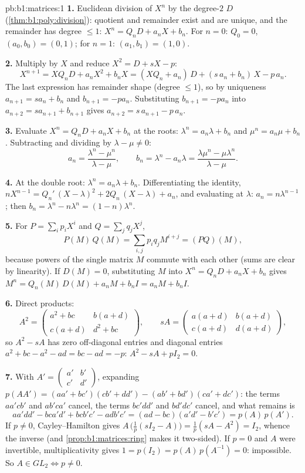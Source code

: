 \begin{solution}{pb:b1:matrices:1}
\textbf{1.} Euclidean division of $X^n$ by the degree-$2$ 
$D$ (\cref{thm:b1:poly:division}): quotient and remainder exist
and are unique, and the remainder has degree $\leq 1$: $X^n =
Q_n D + a_n X + b_n$. For $n = 0$: $Q_0 = 0$, $(a_0, b_0) = (0,
1)$; for $n = 1$: $(a_1, b_1) = (1, 0)$.

\textbf{2.} Multiply by $X$ and reduce $X^2 = D + sX - p$:
\[
X^{n+1} = X Q_n D + a_n X^2 + b_n X
= (X Q_n + a_n)\,D + (s\,a_n + b_n)\,X - p\,a_n .
\]
The last expression has remainder shape (degree $\leq 1$), so by
uniqueness $a_{n+1} = s a_n + b_n$ and $b_{n+1} = -p a_n$.
Substituting $b_{n+1} = -pa_n$ into $a_{n+2} = s a_{n+1} +
b_{n+1}$ gives $a_{n+2} = s\,a_{n+1} - p\,a_n$.

\textbf{3.} Evaluate $X^n = Q_n D + a_n X + b_n$ at the roots:
$\lambda^n = a_n\lambda + b_n$ and $\mu^n = a_n\mu + b_n$.
Subtracting and dividing by $\lambda - \mu \neq 0$:
\[
a_n = \frac{\lambda^n - \mu^n}{\lambda - \mu},
\qquad
b_n = \lambda^n - a_n\lambda
= \frac{\lambda\mu^n - \mu\lambda^n}{\lambda - \mu} .
\]

\textbf{4.} At the double root: $\lambda^n = a_n\lambda + b_n$.
Differentiating the identity, $nX^{n-1} = Q_n'\,(X - \lambda)^2
+ 2Q_n\,(X - \lambda) + a_n$, and evaluating at $\lambda$: $a_n
= n\lambda^{n-1}$; then $b_n = \lambda^n - n\lambda^{n} = (1 -
n)\lambda^{n}$.

\textbf{5.} For $P = \sum_i p_i X^i$ and $Q = \sum_j q_j X^j$,
\[
P(M)\,Q(M) = \sum_{i,j} p_i q_j M^{i+j} = (PQ)(M),
\]
because powers of the single matrix $M$ commute with each other
(sums are clear by linearity). If $D(M) = 0$, substituting $M$
into $X^n = Q_n D + a_n X + b_n$ gives $M^n = Q_n(M)\,D(M) + a_n
M + b_n I = a_n M + b_n I$.

\textbf{6.} Direct products:
\[
A^2 = \begin{pmatrix}
a^2 + bc & b(a + d)\\
c(a + d) & d^2 + bc
\end{pmatrix},
\qquad
s A = \begin{pmatrix}
a(a+d) & b(a+d)\\
c(a+d) & d(a+d)
\end{pmatrix},
\]
so $A^2 - sA$ has zero off-diagonal entries and diagonal entries
$a^2 + bc - a^2 - ad = bc - ad = -p$: $A^2 - sA + pI_2 = 0$.

\textbf{7.} With $A' = \begin{pmatrix} a' & b'\\ c' &
d'\end{pmatrix}$, expanding $p(AA') = (aa' + bc')(cb' + dd') -
(ab' + bd')(ca' + dc')$: the terms $aa'cb'$ and $ab'ca'$ cancel,
the terms $bc'dd'$ and $bd'dc'$ cancel, and what remains is
\[
aa'dd' - bca'd' + bcb'c' - adb'c'
= (ad - bc)(a'd' - b'c') = p(A)\,p(A').
\]
If $p \neq 0$, Cayley--Hamilton gives $A\,\bigl(\tfrac1p(sI_2 -
A)\bigr) = \tfrac1p(sA - A^2) = I_2$, whence the inverse (and
\cref{prop:b1:matrices:ring} makes it two-sided). If $p = 0$ and
$A$ were invertible, multiplicativity gives $1 = p(I_2) =
p(A)\,p(A^{-1}) = 0$: impossible. So $A \in GL_2 \iff p \neq 0$.


\end{solution}
